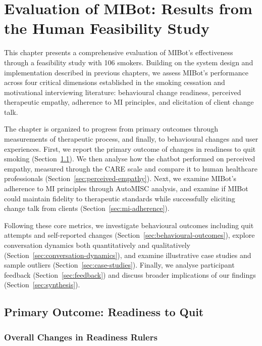 \chapter{Evaluation of MIBot: Results from the Human Feasibility Study}
\label{ch:mibot-eval}

This chapter presents a comprehensive evaluation of MIBot's effectiveness through a feasibility study with 106 smokers. Building on the system design and implementation described in previous chapters, we assess MIBot's performance across four critical dimensions established in the smoking cessation and motivational interviewing literature: behavioural change readiness, perceived therapeutic empathy, adherence to MI principles, and elicitation of client change talk.

The chapter is organized to progress from primary outcomes through measurements of therapeutic process, and finally, to behavioural changes and user experiences. First, we report the primary outcome of changes in readiness to quit smoking (Section~\ref{sec:primary-outcome}). We then analyse how the chatbot performed on perceived empathy, measured through the CARE scale and compare it to human healthcare professionals (Section~\ref{sec:perceived-empathy}). Next, we examine MIBot's adherence to MI principles through AutoMISC analysis, and examine if MIBot could maintain fidelity to therapeutic standards while successfully eliciting change talk from clients (Section~\ref{sec:mi-adherence}).

Following these core metrics, we investigate behavioural outcomes including quit attempts and self-reported changes (Section~\ref{sec:behavioural-outcomes}), explore conversation dynamics both quantitatively and qualitatively (Section~\ref{sec:conversation-dynamics}), and examine illustrative case studies and sample outliers (Section~\ref{sec:case-studies}). Finally, we analyse participant feedback (Section~\ref{sec:feedback}) and discuss broader implications of our findings (Section~\ref{sec:synthesis}).

\section{Primary Outcome: Readiness to Quit}
\label{sec:primary-outcome}

\subsection*{Overall Changes in Readiness Rulers}

